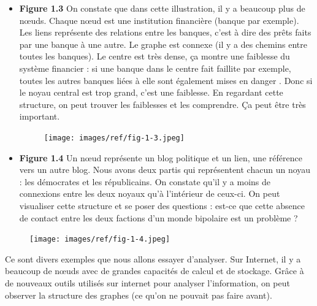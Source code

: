 \begin{itemize}
	\item \textbf{Figure 1.3} On constate que dans cette illustration, il y a beaucoup plus de nœuds. Chaque nœud est une institution financière (banque par exemple). Les liens représente des relations entre les banques, c'est à dire des prêts faits par une banque à une autre. Le graphe est connexe (il y a des chemins entre toutes les banques). Le centre est très dense, ça montre une faiblesse du système financier : si une banque dans le centre fait faillite par exemple, toutes les autres banques liées à elle sont également mises en danger . Donc si le noyau central est trop grand, c'est une faiblesse. En regardant cette structure, on peut trouver les faiblesses et les comprendre. Ça peut être très important.
\begin{figure}[!h]
\centering
\texttt{[image: images/ref/fig-1-3.jpeg]}
\end{figure}

	\item \textbf{Figure 1.4} Un nœud représente un blog politique et un lien, une référence vers un autre blog. Nous avons deux partis qui représentent chacun un noyau : les démocrates et les républicains. On constate qu'il y a moins de connexions entre les deux noyaux qu'à l'intérieur de ceux-ci. On peut visualiser cette structure et se poser des questions : est-ce que cette absence de contact entre les deux factions d'un monde bipolaire est un problème ?
\end{itemize}

\begin{figure}[!H]
\centering
\texttt{[image: images/ref/fig-1-4.jpeg]}
\end{figure}

Ce sont divers exemples que nous allons essayer d'analyser. Sur Internet, il y a beaucoup de nœuds avec de grandes capacités de calcul et de stockage. Grâce à de nouveaux outils utilisés sur internet pour analyser l'information, on peut observer la structure des graphes (ce qu'on ne pouvait pas faire avant).

